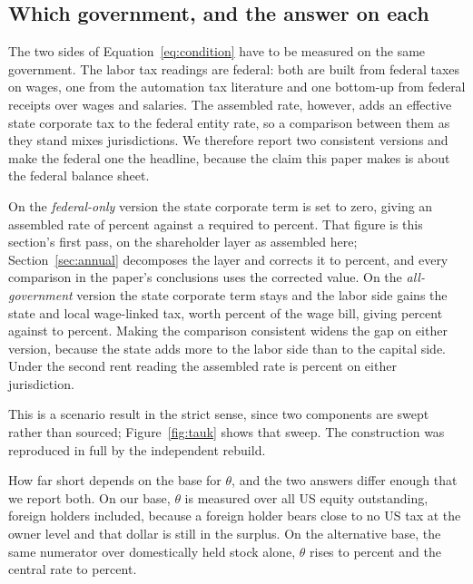 \subsection{Which government, and the answer on each}

The two sides of Equation~\eqref{eq:condition} have to be measured on the same government. The
labor tax readings are federal: both are built from federal taxes on wages, one from the
automation tax literature and one bottom-up from federal receipts over wages and salaries. The
assembled rate, however, adds an effective state corporate tax to the federal entity rate, so a
comparison between them as they stand mixes jurisdictions. We therefore report two consistent
versions and make the federal one the headline, because the claim this paper makes is about the
federal balance sheet.

On the \emph{federal-only} version the state corporate term is set to zero, giving an assembled
rate of  percent against a required  to
 percent. That figure is this section's first pass, on the shareholder
layer as assembled here; Section~\ref{sec:annual} decomposes the layer and corrects it to
 percent, and every comparison in the paper's conclusions uses the corrected
value. On the \emph{all-government} version the state corporate term
stays and the labor side gains the state and local wage-linked tax, worth
 percent of the wage bill, giving  percent
against  to  percent. Making the
comparison consistent widens the gap on either version, because the state adds more to the labor
side than to the capital side. Under the second rent reading the assembled rate is
 percent on either jurisdiction.

This is a scenario result in the strict sense, since two components are swept rather than
sourced; Figure~\ref{fig:tauk} shows that sweep. The construction was reproduced in full by the
independent rebuild.

How far short depends on the base for $\theta$, and the two answers differ enough that we report
both. On our base, $\theta$ is measured over all US equity outstanding, foreign holders included,
because a foreign holder bears close to no US tax at the owner level and that dollar is still in
the surplus. On the alternative base, the same numerator over domestically held stock alone,
$\theta$ rises to  percent and the central rate to 
percent.

